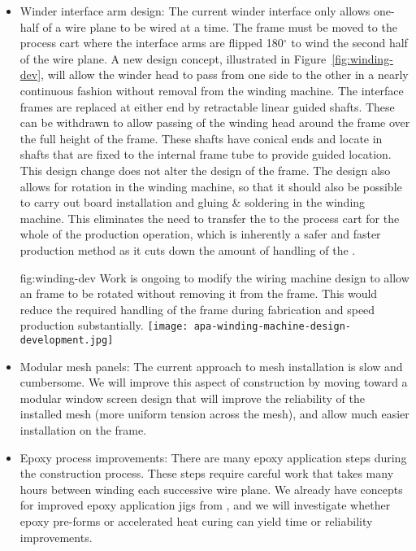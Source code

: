 \begin{itemize}
\item Winder interface arm design: The current winder interface only allows one-half of a wire plane to be wired at a time. The  frame must be moved to the process cart where the interface arms are flipped 180$^\circ$ to wind the second half of the wire plane.  A new design concept, illustrated in Figure~\ref{fig:winding-dev}, will allow the winder head to pass from one side to the other in a nearly continuous fashion without removal from the winding machine.  The interface frames are replaced at either end by retractable linear guided shafts. These can be withdrawn to allow passing of the winding head around the frame over the full height of the frame. These shafts have conical ends and locate in shafts that are fixed to the internal frame tube to provide guided location. This design change does not alter the design of the frame. The design also allows for rotation in the winding machine, so that it should also be possible to carry out board installation and gluing \& soldering in the winding machine. This eliminates the need to transfer the  to the process cart for the whole of the production operation, which is inherently a safer and faster production method as it cuts down the amount of handling of the .

\begin{dunefigure}{fig:winding-dev}
{Work is ongoing to modify the wiring machine design to allow an  frame to be rotated without removing it from the frame.  This would reduce the required handling of the frame during fabrication and speed production substantially.}
\texttt{[image: apa-winding-machine-design-development.jpg]} 
\end{dunefigure}

\item Modular mesh panels: The current approach to mesh installation is slow and cumbersome. We will improve this aspect of construction by moving toward a modular window screen design that will improve the reliability of the installed mesh (more uniform tension across the mesh), and allow much easier installation on the  frame.

\item Epoxy process improvements: There are many epoxy application steps during the construction process. These steps require careful work that takes many hours between winding each successive wire plane. We already have concepts for improved epoxy application jigs from , and we will investigate whether epoxy pre-forms or accelerated heat curing can yield time or reliability improvements.


\end{itemize}
